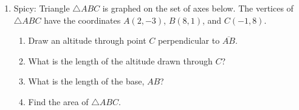\documentclass[12pt, twoside]{article}
\begin{document}
\begin{enumerate}
  \item Spicy: Triangle $\triangle ABC$ is graphed on the set of axes below. The vertices of $\triangle ABC$ have the coordinates $A(2,-3)$, $B(8,1)$, and $C(-1,8)$.
    \begin{center} %
    \end{center}
    \begin{enumerate}
      \item Draw an altitude through point $C$ perpendicular to $\overline{AB}$.
      \item What is the length of the altitude drawn through $C$? \vspace{3.5cm}
      \item What is the length of the base, $AB$?  \vspace{3.5cm}
      \item Find the area of  $\triangle ABC$.
    \end{enumerate}


  \end{enumerate}

  
\end{document}

